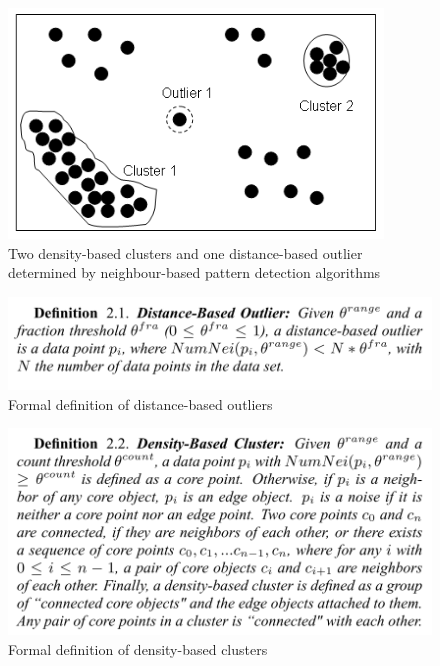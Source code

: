 \begin{figure}[!htb]
    \begin{center}
      \includegraphics[scale=0.8]{figures/density-distance-based.png}
      \caption[Clustering and outlier identification plot]{Two density-based clusters and one distance-based outlier determined by neighbour-based pattern detection algorithms}
      \label{fig:plot-cluster-outlier}
    \end{center}
\end{figure}

\begin{figure}[!htb]
    \begin{center}
      \includegraphics[scale=0.8]{figures/distance-based-outlier-def.png}
      \caption{Formal definition of distance-based outliers}
      \label{fig:distance-outlier-def}
    \end{center}
\end{figure}

\begin{figure}[!htb]
    \begin{center}
      \includegraphics[scale=0.8]{figures/density-based-cluster-def.png}
      \caption{Formal definition of density-based clusters}
      \label{fig:density-cluster-def}
    \end{center}
\end{figure}

